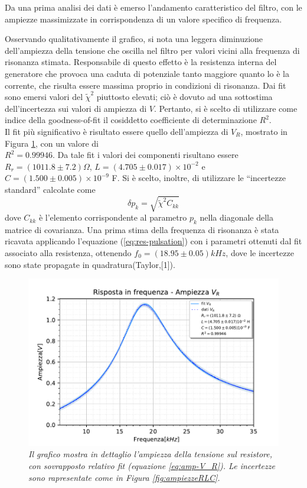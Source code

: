 Da una prima analisi dei dati è emerso l'andamento caratteristico del filtro, con le ampiezze massimizzate
in corrispondenza di un valore specifico di frequenza.

Osservando qualitativamente il grafico, si nota una leggera diminuzione dell’ampiezza della tensione che oscilla nel filtro
per valori vicini alla frequenza di risonanza stimata. Responsabile di questo effetto è la resistenza interna del generatore
che provoca una caduta di potenziale tanto maggiore quanto lo è la corrente, che risulta essere massima proprio in
condizioni di risonanza.
 Dai fit sono emersi valori del $\tilde{\chi}^2$ piuttosto elevati; ciò è dovuto ad una sottostima dell'incertezza sui
valori di ampiezza di $V$. Pertanto, si è scelto di utilizzare come indice della goodness-of-fit
il cosiddetto coefficiente di determinazione $R^2$. \\
Il fit più significativo è risultato essere quello dell'ampiezza di $V_R$, mostrato in Figura \ref{fig:ampiezzeR}, con
un valore di \\
$R^2 = 0.99946$. Da tale fit i valori dei componenti risultano essere $R_r = (1011.8 \pm 7.2) \Omega$,
$L = (4.705 \pm 0.017) \times 10^{-2}$ e $C = (1.500 \pm 0.005)\times 10^{-9}$ F. Si è scelto, inoltre, di utilizzare le
``incertezze standard'' calcolate come
\[
    \delta p_k = \sqrt{\tilde{\chi}^2 C_{kk}}
\]
dove $C_{kk}$ è l'elemento corrispondente al parametro $p_k$ nella diagonale della matrice di covarianza.
Una prima stima della frequenza di risonanza è stata ricavata applicando l'equazione (\ref{eq:res-pulsation}) con i
parametri ottenuti dal fit associato alla resistenza, ottenendo $f_0 = (18.95 \pm 0.05) kHz$, dove le incertezze sono
state propagate in quadratura(Taylor,[1]).
\begin{figure}[h]
    \centering
    \includegraphics[width=.77\textwidth]{../figs/Risposta-in-frequenza-ampiezza-resistenza.pdf}
    \caption{\emph{Il grafico mostra in dettaglio l'ampiezza della tensione sul resistore, con sovrapposto relativo fit
        (equazione \ref{eq:amp-V_R}). Le incertezze sono rapresentate come in Figura \ref{fig:ampiezzeRLC}.}}\label{fig:ampiezzeR}
\end{figure}

